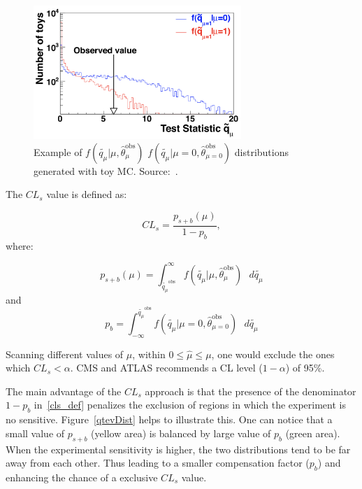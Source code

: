 \begin{figure}[htbp]
  \centering
  \includegraphics[width=0.7\textwidth,keepaspectratio]{figures_and_tables/cls/q_tilde.png}
  \caption{Example of $f(\tilde{q_{\mu}} \vert \mu, \hat{\theta}_{\mu}^{\text{obs}})$ $f(\tilde{q_{\mu}} \vert \mu=0, \hat{\theta}_{\mu = 0}^{\text{obs}})$ distributions generated with toy MC. Source:~\cite{cms_atlas_statistical_guidelines}.}
  \label{toy_mc_profile_likelihood_test}
\end{figure}

The $CL_s$ value is defined as:

\begin{equation}
  \label{cls_def}
  CL_s=\frac{p_{s+b}(\mu)}{1-p_{b}},
\end{equation}
where:

\begin{equation}
  \label{cls_p_def1}
  p_{s+b}(\mu) = \int_{\tilde{q_{\mu}}^{\text{obs}}}^{\infty} f(\tilde{q_{\mu}} \vert \mu, \hat{\theta}_{\mu}^{\text{obs}}) \text{ }d\tilde{q_{\mu}}
\end{equation}
and
\begin{equation}
  \label{cls_p_def2}
  p_{b} = \int^{\tilde{q_{\mu}}^{\text{obs}}}_{-\infty} f(\tilde{q_{\mu}} \vert \mu=0, \hat{\theta}_{\mu = 0}^{\text{obs}}) \text{ }d\tilde{q_{\mu}}
\end{equation}

Scanning different values of $\mu$, within $0 \leqslant \hat{\mu} \leqslant \mu$, one would exclude the ones which $CL_s < \alpha$. CMS and ATLAS recommends a CL level ($1-\alpha$) of 95\%.

The main advantage of the $CL_s$ approach is that the presence of the denominator $1-p_{b}$ in~\ref{cls_def} penalizes the exclusion of regions in which the experiment is no sensitive. Figure~\ref{qtevDist} helps to illustrate this. One can notice that a small value of $p_{s+b}$ (yellow area) is balanced by large value of $p_{b}$ (green area). When the experimental sensitivity is higher, the two distributions tend to be far away from each other. Thus leading to a smaller compensation factor ($p_{b}$) and enhancing the chance of a exclusive $CL_s$ value.

